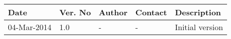 \begin{center}
    \begin{tabular}{ | l | p{1cm} | l | l | p{5cm} |}
    \hline
    Date&Ver. No & Author &Contact &Description\\ \hline
	04-Mar-2014&1.0 & - & - & Initial version\\
	\hline
    \end{tabular}
\end{center}